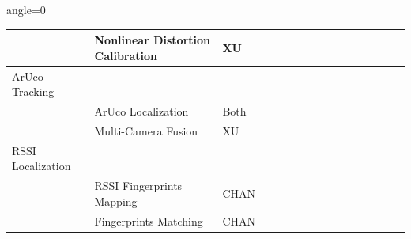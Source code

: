 \documentclass[11pt]{article}
\begin{document}
\begin{landscape}
\begin{table}[H]
\begin{adjustbox}{angle=0}
\begin{tabular}{|p{3.2cm}|p{3.2cm}|p{1.2cm}|c|c|c|c|c|c|c|c|c|c|c|c|c|}
        \hline
        &Nonlinear Distortion Calibration&XU& & & &\cellcolor{yellow!20}&\cellcolor{yellow!20}&\cellcolor{yellow!20}&\cellcolor{yellow!20}& &\cellcolor{yellow!20}&\cellcolor{yellow!20}&\cellcolor{yellow!20}&\cellcolor{yellow!20}&\cellcolor{yellow!20}\\
        \hline
        ArUco Tracking& & &\cellcolor{blue!20}&\cellcolor{blue!20}&\cellcolor{blue!20}&\cellcolor{blue!20}& & & & & & & & & \\
        \hline
        &ArUco Localization&Both& & & & & & & & & & & & & \\
        \hline
        &Multi-Camera Fusion&XU& & & & & & & & & & & & & \\
        \hline
        RSSI Localization& & &\cellcolor{blue!20}&\cellcolor{blue!20}&\cellcolor{blue!20}&\cellcolor{blue!20}&\cellcolor{blue!20}&\cellcolor{blue!20}&\cellcolor{blue!20}&\cellcolor{blue!20}&\cellcolor{blue!20}&\cellcolor{blue!20}&\cellcolor{blue!20}&\cellcolor{blue!20}&\cellcolor{blue!20}\\
        \hline
        &RSSI Fingerprints Mapping&CHAN&\cellcolor{yellow!20}&\cellcolor{yellow!20}&\cellcolor{yellow!20}&\cellcolor{yellow!20}&\cellcolor{yellow!20}&\cellcolor{yellow!20}&\cellcolor{yellow!20}&\cellcolor{yellow!20}&\cellcolor{yellow!20}&\cellcolor{yellow!20}&\cellcolor{yellow!20}& & \\
        \hline
        &Fingerprints Matching&CHAN& & & & & & & &\cellcolor{yellow!20}&\cellcolor{yellow!20}&\cellcolor{yellow!20}&\cellcolor{yellow!20}&\cellcolor{yellow!20}&\cellcolor{yellow!20}\\
        \hline
        \end{tabular}
        \end{adjustbox}
        \end{table}
    \end{landscape}
    \newpage
\end{document}
